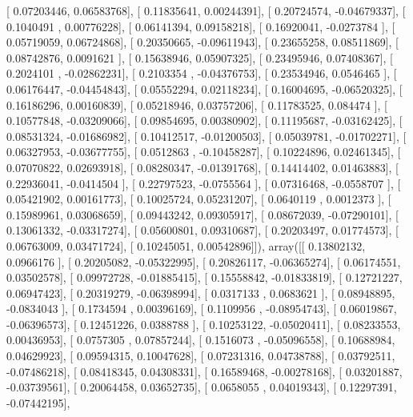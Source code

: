 \documentclass{article}
\begin{document}
       [ 0.07203446,  0.06583768],
       [ 0.11835641,  0.00244391],
       [ 0.20724574, -0.04679337],
       [ 0.1040491 ,  0.00776228],
       [ 0.06141394,  0.09158218],
       [ 0.16920041, -0.0273784 ],
       [ 0.05719059,  0.06724868],
       [ 0.20350665, -0.09611943],
       [ 0.23655258,  0.08511869],
       [ 0.08742876,  0.0091621 ],
       [ 0.15638946,  0.05907325],
       [ 0.23495946,  0.07408367],
       [ 0.2024101 , -0.02862231],
       [ 0.2103354 , -0.04376753],
       [ 0.23534946,  0.0546465 ],
       [ 0.06176447, -0.04454843],
       [ 0.05552294,  0.02118234],
       [ 0.16004695, -0.06520325],
       [ 0.16186296,  0.00160839],
       [ 0.05218946,  0.03757206],
       [ 0.11783525,  0.084474  ],
       [ 0.10577848, -0.03209066],
       [ 0.09854695,  0.00380902],
       [ 0.11195687, -0.03162425],
       [ 0.08531324, -0.01686982],
       [ 0.10412517, -0.01200503],
       [ 0.05039781, -0.01702271],
       [ 0.06327953, -0.03677755],
       [ 0.0512863 , -0.10458287],
       [ 0.10224896,  0.02461345],
       [ 0.07070822,  0.02693918],
       [ 0.08280347, -0.01391768],
       [ 0.14414402,  0.01463883],
       [ 0.22936041, -0.0414504 ],
       [ 0.22797523, -0.0755564 ],
       [ 0.07316468, -0.0558707 ],
       [ 0.05421902,  0.00161773],
       [ 0.10025724,  0.05231207],
       [ 0.0640119 ,  0.0012373 ],
       [ 0.15989961,  0.03068659],
       [ 0.09443242,  0.09305917],
       [ 0.08672039, -0.07290101],
       [ 0.13061332, -0.03317274],
       [ 0.05600801,  0.09310687],
       [ 0.20203497,  0.01774573],
       [ 0.06763009,  0.03471724],
       [ 0.10245051,  0.00542896]]), array([[ 0.13802132,  0.0966176 ],
       [ 0.20205082, -0.05322995],
       [ 0.20826117, -0.06365274],
       [ 0.06174551,  0.03502578],
       [ 0.09972728, -0.01885415],
       [ 0.15558842, -0.01833819],
       [ 0.12721227,  0.06947423],
       [ 0.20319279, -0.06398994],
       [ 0.0317133 ,  0.0683621 ],
       [ 0.08948895, -0.0834043 ],
       [ 0.1734594 ,  0.00396169],
       [ 0.1109956 , -0.08954743],
       [ 0.06019867, -0.06396573],
       [ 0.12451226,  0.0388788 ],
       [ 0.10253122, -0.05020411],
       [ 0.08233553,  0.00436953],
       [ 0.0757305 ,  0.07857244],
       [ 0.1516073 , -0.05096558],
       [ 0.10688984,  0.04629923],
       [ 0.09594315,  0.10047628],
       [ 0.07231316,  0.04738788],
       [ 0.03792511, -0.07486218],
       [ 0.08418345,  0.04308331],
       [ 0.16589468, -0.00278168],
       [ 0.03201887, -0.03739561],
       [ 0.20064458,  0.03652735],
       [ 0.0658055 ,  0.04019343],
       [ 0.12297391, -0.07442195],
\end{document}
